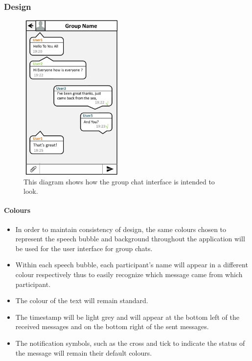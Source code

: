 \documentclass[11pt]{article}
\begin{document}
\subsubsection{Design}
\begin{figure}[H]
\centering
\includegraphics[width=2in]{./images/Final.jpg}
\caption[Sample Group Chat Screen]{This diagram shows how the group chat interface is intended to look.}
\label{cd-group-chat-interface}
\end{figure}

\paragraph{Colours}
\begin{itemize}
\item	In order to maintain consistency of design, the same colours chosen to represent the speech bubble and background throughout the application will be used for the user interface for group chats.
\item	Within each speech bubble, each participant's name will appear in a different colour respectively thus to easily recognize which message came from which participant.
\item	The colour of the text will remain standard.
\item The timestamp will be light grey and will appear at the bottom left of the received  messages and on the bottom right of the sent messages.
\item The notification symbols, such as the cross and tick to indicate the status of the message will remain their default colours.\\
\end{itemize}
\end{document}
